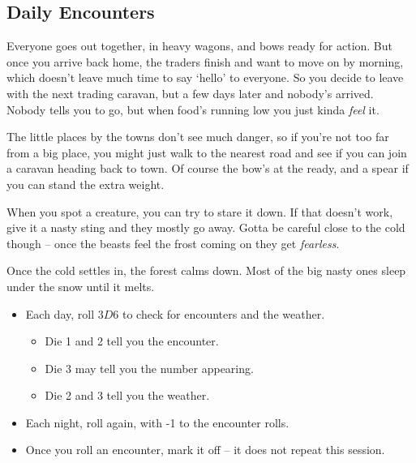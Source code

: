 \begin{multicols}{2}

\subsection{Daily Encounters}

\begin{exampletext}
  Everyone goes out together, in heavy wagons, and bows ready for action.
  But once you arrive back home, the traders finish and want to move on by morning, which doesn't leave much time to say `hello' to everyone.
  So you decide to leave with the next trading caravan, but a few days later and nobody's arrived.
  Nobody tells you to go, but when food's running low you just kinda \emph{feel} it.

  The little places by the towns don't see much danger, so if you're not too far from a big place, you might just walk to the nearest road and see if you can join a caravan heading back to town.
  Of course the bow's at the ready, and a spear if you can stand the extra weight.

  When you spot a creature, you can try to stare it down.
  If that doesn't work, give it a nasty sting and they mostly go away.
  Gotta be careful close to the cold though -- once the beasts feel the frost coming on they get \emph{fearless}.

  Once the cold settles in, the forest calms down.
  Most of the big nasty ones sleep under the snow until it melts.
\end{exampletext}


\begin{itemize}
  \item
  Each day, roll $3D6$ to check for encounters and the weather.
  \begin{itemize}
    \item
    Die 1 and 2 tell you the encounter.
    \item
    Die 3 may tell you the number appearing.
    \item
    Die 2 and 3 tell you the weather.
  \end{itemize}
  \item
  Each night, roll again, with -1 to the encounter rolls.
  \item
  Once you roll an encounter, mark it off -- it does not repeat this session.
\end{itemize}


\end{multicols}
